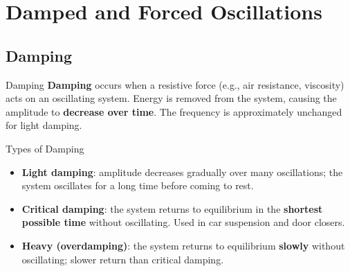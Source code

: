 \begin{center}
\end{center}

\section{Damped and Forced Oscillations}

\subsection{Damping}

\begin{definitionbox}{Damping}
\textbf{Damping} occurs when a resistive force (e.g., air resistance, viscosity) acts on an oscillating system. Energy is removed from the system, causing the amplitude to \textbf{decrease over time}. The frequency is approximately unchanged for light damping.
\end{definitionbox}

\begin{keybox}{Types of Damping}
\begin{itemize}[itemsep=3pt]
  \item \textbf{Light damping}: amplitude decreases gradually over many oscillations; the system oscillates for a long time before coming to rest.
  \item \textbf{Critical damping}: the system returns to equilibrium in the \textbf{shortest possible time} without oscillating. Used in car suspension and door closers.
  \item \textbf{Heavy (overdamping)}: the system returns to equilibrium \textbf{slowly} without oscillating; slower return than critical damping.
\end{itemize}
\end{keybox}

